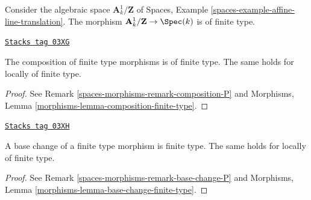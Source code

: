 Consider the algebraic space $\mathbf{A}^1_k/\mathbf{Z}$ of
Spaces, Example \ref{spaces-example-affine-line-translation}.
The morphism $\mathbf{A}^1_k/\mathbf{Z} \to \Spec(k)$
is of finite type.

\begin{lemma}
\label{spaces-morphisms-lemma-composition-finite-type}
\href{https://stacks.math.columbia.edu/tag/03XG}{\texttt{Stacks tag 03XG}}

The composition of finite type morphisms is of finite type.
The same holds for locally of finite type.
\end{lemma}

\begin{proof}
See Remark \ref{spaces-morphisms-remark-composition-P} and
Morphisms, Lemma \ref{morphisms-lemma-composition-finite-type}.
\end{proof}

\begin{lemma}
\label{spaces-morphisms-lemma-base-change-finite-type}
\href{https://stacks.math.columbia.edu/tag/03XH}{\texttt{Stacks tag 03XH}}

A base change of a finite type morphism is finite type.
The same holds for locally of finite type.
\end{lemma}

\begin{proof}
See Remark \ref{spaces-morphisms-remark-base-change-P} and
Morphisms, Lemma \ref{morphisms-lemma-base-change-finite-type}.
\end{proof}

